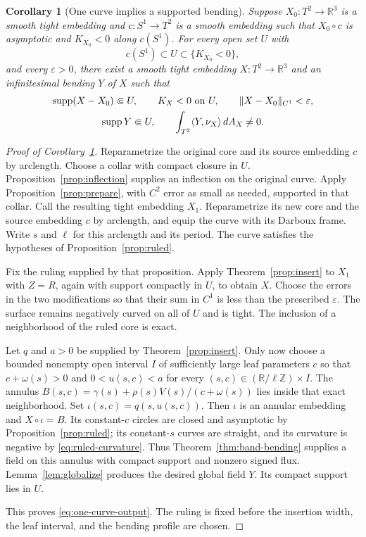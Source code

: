 \documentclass[11pt]{amsart}
\newtheorem{corollary}[theorem]{Corollary}
\theoremstyle{definition}
\newcommand{\R}{\mathbb R}
\DeclareMathOperator{\supp}{supp}
\begin{document}
\begin{corollary}[One curve implies a supported bending]\label{thm:one-curve}
Suppose $X_0:T^2\to\R^3$ is a smooth tight embedding and
$c:S^1\to T^2$ is a smooth embedding such that $X_0\circ c$ is
asymptotic and $K_{X_0}<0$ along $c(S^1)$.
For every open set $U$ with
\[
 c(S^1)\subset U\subset\{K_{X_0}<0\},
\]
and every $\varepsilon>0$, there exist a smooth tight embedding
$X:T^2\to\R^3$ and an infinitesimal bending $Y$ of $X$ such that
\begin{equation}\label{eq:one-curve-output}
 \begin{gathered}
 \supp(X-X_0)\Subset U,\qquad K_X<0\ \hbox{on }U,\qquad
 \|X-X_0\|_{C^1}<\varepsilon,\\
 \supp Y\Subset U,\qquad
 \int_{T^2}\langle Y,\nu_X\rangle\,dA_X\ne0.
 \end{gathered}
\end{equation}
\end{corollary}

\begin{proof}[Proof of Corollary~\ref{thm:one-curve}]
Reparametrize the original core and its source embedding $c$ by
arclength. Choose a collar with compact closure in $U$.
Proposition~\ref{prop:inflection} supplies an inflection on the
original curve. Apply Proposition~\ref{prop:prepare}, with
$C^2$ error as small as needed, supported in that collar.
Call the resulting tight embedding $X_1$.
Reparametrize its new core and the source embedding $c$ by
arclength, and equip the curve with its Darboux frame. Write $s$ and
$\ell$ for this arclength and its period. The curve satisfies the
hypotheses of Proposition~\ref{prop:ruled}.

Fix the ruling supplied by that proposition.
Apply Theorem~\ref{prop:insert} to $X_1$ with $Z=R$,
again with support compactly in $U$, to obtain $X$.
Choose the errors in the two modifications so that their sum
in $C^1$ is less than the prescribed $\varepsilon$.
The surface remains negatively curved on all of $U$ and is tight.
The inclusion of a neighborhood of the ruled core is exact.

Let $q$ and $a>0$ be supplied by Theorem~\ref{prop:insert}.
Only now choose a bounded nonempty open interval $I$ of sufficiently
large leaf parameters $c$ so that $c+\omega(s)>0$ and
$0<u(s,c)<a$ for every $(s,c)\in(\R/\ell\mathbb Z)\times I$.
The annulus
$B(s,c)=\gamma(s)+\rho(s)V(s)/(c+\omega(s))$
lies inside that exact neighborhood.
Set $\iota(s,c)=q(s,u(s,c))$.
Then $\iota$ is an annular embedding and
$X\circ\iota=B$. Its constant-$c$ circles are closed and
asymptotic by Proposition~\ref{prop:ruled}; its constant-$s$
curves are straight, and its curvature is negative by
\eqref{eq:ruled-curvature}.
Thus Theorem~\ref{thm:band-bending} supplies a field
on this annulus with compact support and nonzero signed
flux. Lemma~\ref{lem:globalize} produces the desired global
field $Y$. Its compact support lies in $U$.

This proves \eqref{eq:one-curve-output}. The ruling is fixed before
the insertion width, the leaf interval, and the bending profile
are chosen.
\end{proof}
\end{document}
